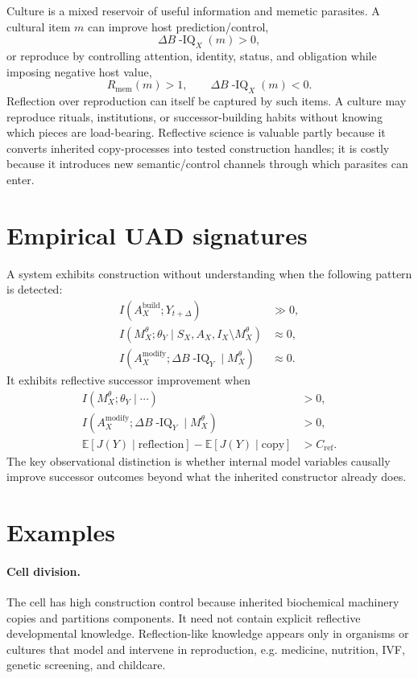 \documentclass[11pt]{article}
\newcommand{\E}{\mathbb{E}}
\newcommand{\Biq}{B\!\operatorname{-IQ}}
\newcommand{\MI}{I}
\begin{document}
Culture is a mixed reservoir of useful information and memetic parasites. A cultural item $m$ can improve host prediction/control,
\begin{equation}
  \Delta \Biq_X(m)>0,
\end{equation}
or reproduce by controlling attention, identity, status, and obligation while imposing negative host value,
\begin{equation}
  R_{\mathrm{mem}}(m)>1,\qquad \Delta \Biq_X(m)<0.
\end{equation}
Reflection over reproduction can itself be captured by such items. A culture may reproduce rituals, institutions, or successor-building habits without knowing which pieces are load-bearing. Reflective science is valuable partly because it converts inherited copy-processes into tested construction handles; it is costly because it introduces new semantic/control channels through which parasites can enter.

\section{Empirical UAD signatures}

A system exhibits construction without understanding when the following pattern is detected:
\begin{align}
  \MI(A_X^{\mathrm{build}};Y_{t+\Delta}) &\gg 0,\\
  \MI(M_X^\theta;\theta_Y\mid S_X,A_X,I_X\setminus M_X^\theta) &\approx 0,\\
  \MI(A_X^{\mathrm{modify}};\Delta \Biq_Y\mid M_X^\theta) &\approx 0.
\end{align}
It exhibits reflective successor improvement when
\begin{align}
  \MI(M_X^\theta;\theta_Y\mid \cdots)&>0,\\
  \MI(A_X^{\mathrm{modify}};\Delta \Biq_Y\mid M_X^\theta)&>0,\\
  \E[J(Y)\mid \mathrm{reflection}]-\E[J(Y)\mid \mathrm{copy}]&>C_{\mathrm{ref}}.
\end{align}
The key observational distinction is whether internal model variables causally improve successor outcomes beyond what the inherited constructor already does.

\section{Examples}

\paragraph{Cell division.} The cell has high construction control because inherited biochemical machinery copies and partitions components. It need not contain explicit reflective developmental knowledge. Reflection-like knowledge appears only in organisms or cultures that model and intervene in reproduction, e.g. medicine, nutrition, IVF, genetic screening, and childcare.
\end{document}
